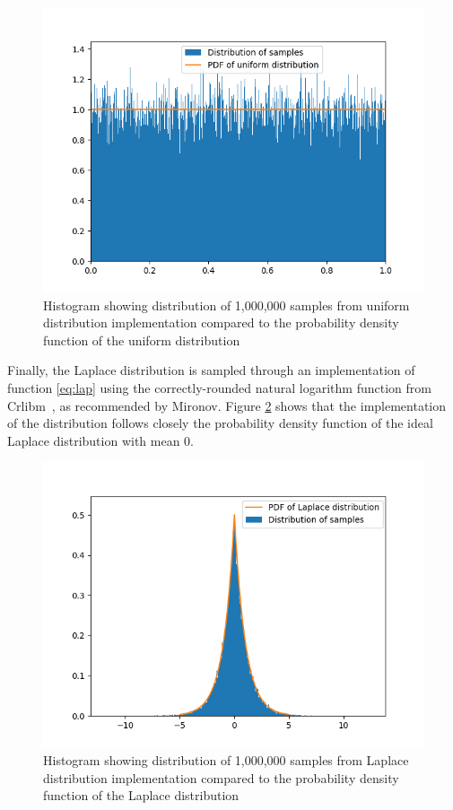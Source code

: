 \documentclass[orivec,envcountsame]{llncs}
\begin{document}
\begin{figure}[h]
\begin{center}
\includegraphics[scale=0.65]{tex/graphics/uniform.png}
\caption{Histogram showing distribution of 1,000,000 samples from uniform distribution implementation compared to the probability density function of the uniform distribution}
\label{fig:uniform}
\end{center}
\end{figure}

Finally, the Laplace distribution is sampled through an implementation of function \ref{eq:lap} using the correctly-rounded natural logarithm function from Crlibm~\cite{lauter_muller_2007,crlibm}, as recommended by Mironov. Figure \ref{fig:laplace} shows that the implementation of the distribution follows closely the probability density function of the ideal Laplace distribution with mean 0.


\begin{figure}[ht]
\begin{center}
\includegraphics[scale=0.65]{tex/graphics/Laplace.png}
\caption{Histogram showing distribution of 1,000,000 samples from Laplace distribution implementation compared to the probability density function of the Laplace distribution}
\label{fig:laplace}
\end{center}
\end{figure}
\end{document}
